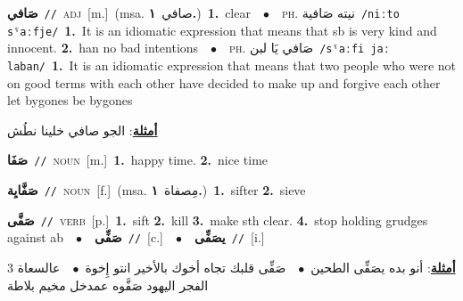 \documentclass[10pt,a4paper,twoside]{article} %
\begin{document}
\begin{multicols}{2}
{\setlength\topsep{0pt}\textbf{\foreignlanguage{arabic}{صَافي}}\ {\color{gray}\texttt{//}\color{black}}\ \textsc{adj}\ [m.]\ \color{gray}(msa. \foreignlanguage{arabic}{صافي}~\foreignlanguage{arabic}{\textbf{١.}})\color{black}\ \textbf{1.}~clear\ \ $\bullet$\ \ \textsc{ph.} \color{gray} \foreignlanguage{arabic}{نيته صَافية}\color{black}\ {\color{gray}\texttt{/{\sffamily niːto sˤaːfje}/}\color{black}}\ \textbf{1.}~It is an idiomatic expression that means that sb is very kind and innocent.  \textbf{2.}~han no bad intentions\ \ $\bullet$\ \ \textsc{ph.} \color{gray} \foreignlanguage{arabic}{صَافي يَا لبن}\color{black}\ {\color{gray}\texttt{/{\sffamily sˤaːfi jaː laban}/}\color{black}}\ \textbf{1.}~It is an idiomatic expression that means that two people who were not on good terms with each other have decided to make up and forgive each other let bygones be bygones\  \begin{flushright}\color{gray}\foreignlanguage{arabic}{\textbf{\underline{\foreignlanguage{arabic}{أمثلة}}}: الجو صافي خلينا نطُش}\end{flushright}\color{black}} \vspace{2mm}

{\setlength\topsep{0pt}\textbf{\foreignlanguage{arabic}{صَفَا}}\ {\color{gray}\texttt{//}\color{black}}\ \textsc{noun}\ [m.]\ \textbf{1.}~happy time.  \textbf{2.}~nice time\ } \vspace{2mm}

{\setlength\topsep{0pt}\textbf{\foreignlanguage{arabic}{صَفَّايِة}}\ {\color{gray}\texttt{//}\color{black}}\ \textsc{noun}\ [f.]\ \color{gray}(msa. \foreignlanguage{arabic}{مِصفاة}~\foreignlanguage{arabic}{\textbf{١.}})\color{black}\ \textbf{1.}~sifter  \textbf{2.}~sieve\ } \vspace{2mm}

{\setlength\topsep{0pt}\textbf{\foreignlanguage{arabic}{صَفَّى}}\ {\color{gray}\texttt{//}\color{black}}\ \textsc{verb}\ [p.]\ \textbf{1.}~sift  \textbf{2.}~kill  \textbf{3.}~make sth clear.  \textbf{4.}~stop holding grudges against ab\ \ $\bullet$\ \ \setlength\topsep{0pt}\textbf{\foreignlanguage{arabic}{صَفِّى}}\ {\color{gray}\texttt{//}\color{black}}\ [c.]\ \ $\bullet$\ \ \setlength\topsep{0pt}\textbf{\foreignlanguage{arabic}{يصَفِّى}}\ {\color{gray}\texttt{//}\color{black}}\ [i.]\  \begin{flushright}\color{gray}\foreignlanguage{arabic}{\textbf{\underline{\foreignlanguage{arabic}{أمثلة}}}: أنو بده يصَفِّى الطحين\ $\bullet$\ \  صَفِّى قلبك تجاه أخوك بالأخير انتو إِخوة\ $\bullet$\ \  عالسعاة 3 الفجر اليهود صَفَّوه عمدخل مخيم بلاطة}\end{flushright}\color{black}} \vspace{2mm}


\end{multicols}
\end{document}
